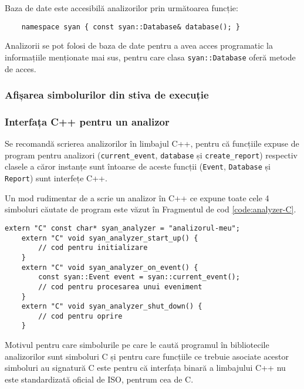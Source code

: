 Baza de date este accesibilă analizorilor prin următoarea funcție:
\begin{lstlisting}
    namespace syan { const syan::Database& database(); }
\end{lstlisting}
Analizorii se pot folosi de baza de date pentru a avea acces programatic
la informațiile menționate mai sus, pentru care clasa
\lstinline{syan::Database} oferă metode de acces.

\subsubsection{Afișarea simbolurilor din stiva de execuție}
\label{stack-reconstruction}


\subsubsection{Interfața C++ pentru un analizor}

Se recomandă scrierea analizorilor în limbajul C++, pentru că funcțiile
expuse de program pentru analizori (\lstinline{current_event},
\lstinline{database} și \lstinline{create_report}) respectiv clasele a
căror instanțe sunt întoarse de aceste funcții (\lstinline{Event},
\lstinline{Database} și \lstinline{Report}) sunt interfețe C++.

Un mod rudimentar de a scrie un analizor în C++ ce expune toate cele 4
simboluri căutate de program este văzut în Fragmentul de cod
\ref{code:analyzer-C}.
\begin{lstlisting}[caption=Interfața rudimentară a unui analizor,
                   label=code:analyzer-C]
    extern "C" const char* syan_analyzer = "analizorul-meu";
    extern "C" void syan_analyzer_start_up() {
        // cod pentru initializare
    }
    extern "C" void syan_analyzer_on_event() {
        const syan::Event event = syan::current_event();
        // cod pentru procesarea unui eveniment
    }
    extern "C" void syan_analyzer_shut_down() {
        // cod pentru oprire
    }
\end{lstlisting}
Motivul pentru care simbolurile pe care le caută programul în
bibliotecile analizorilor sunt simboluri C și pentru care funcțiile ce
trebuie asociate acestor simboluri au signatură C este pentru că
interfața binară a limbajului C++ nu este standardizată oficial de ISO,
pentrum cea de C.

